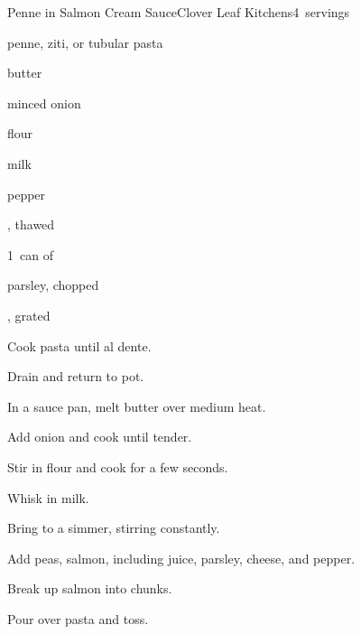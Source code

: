 \begin{recipe}{Penne in Salmon Cream Sauce}{Clover Leaf Kitchens}{4~servings}

\begin{ingredients}
\item {} penne, ziti, or tubular pasta
\item {} butter
\item {} minced onion
\item {} flour
\item \C{1\quarter} milk
\item pepper
\item {} , thawed
\item 1~can of 
\item \C{\quarter} parsley, chopped
\item \C{\quarter} , grated
\end{ingredients}

\begin{directions}
\item Cook pasta until al dente.
\item Drain and return to pot.
\item In a sauce pan, melt butter over medium heat.
\item Add onion and cook until tender.
\item Stir in flour and cook for a few seconds.
\item Whisk in milk.
\item Bring to a simmer, stirring constantly.
\item Add peas, salmon, including juice, parsley, cheese, and pepper.
\item Break up salmon into chunks.
\item Pour over pasta and toss.
\end{directions}

\end{recipe}
